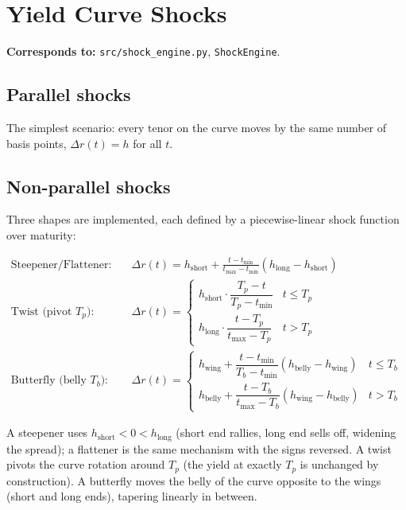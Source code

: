\documentclass[11pt]{article}
\begin{document}
\section{Yield Curve Shocks}
\label{sec:shocks}

\textbf{Corresponds to:} \texttt{src/shock\_engine.py}, \texttt{ShockEngine}.

\subsection{Parallel shocks}

The simplest scenario: every tenor on the curve moves by the same number of basis points,
$\Delta r(t) = h$ for all $t$.

\subsection{Non-parallel shocks}

Three shapes are implemented, each defined by a piecewise-linear shock function over maturity:

\begin{align}
  \text{Steepener/Flattener:} \quad & \Delta r(t) = h_{\text{short}} + \frac{t - t_{\min}}{t_{\max}-t_{\min}}\left(h_{\text{long}}-h_{\text{short}}\right) \\
  \text{Twist (pivot } T_p\text{):} \quad & \Delta r(t) =
    \begin{cases}
      h_{\text{short}} \cdot \dfrac{T_p - t}{T_p - t_{\min}} & t \le T_p \\[4pt]
      h_{\text{long}} \cdot \dfrac{t - T_p}{t_{\max} - T_p} & t > T_p
    \end{cases} \\
  \text{Butterfly (belly } T_b\text{):} \quad & \Delta r(t) =
    \begin{cases}
      h_{\text{wing}} + \dfrac{t-t_{\min}}{T_b - t_{\min}}(h_{\text{belly}} - h_{\text{wing}}) & t \le T_b \\[4pt]
      h_{\text{belly}} + \dfrac{t - T_b}{t_{\max}-T_b}(h_{\text{wing}} - h_{\text{belly}}) & t > T_b
    \end{cases}
\end{align}

A steepener uses $h_{\text{short}} < 0 < h_{\text{long}}$ (short end rallies, long end sells
off, widening the spread); a flattener is the same mechanism with the signs reversed. A twist
pivots the curve rotation around $T_p$ (the yield at exactly $T_p$ is unchanged by
construction). A butterfly moves the belly of the curve opposite to the wings (short and long
ends), tapering linearly in between.
\end{document}
